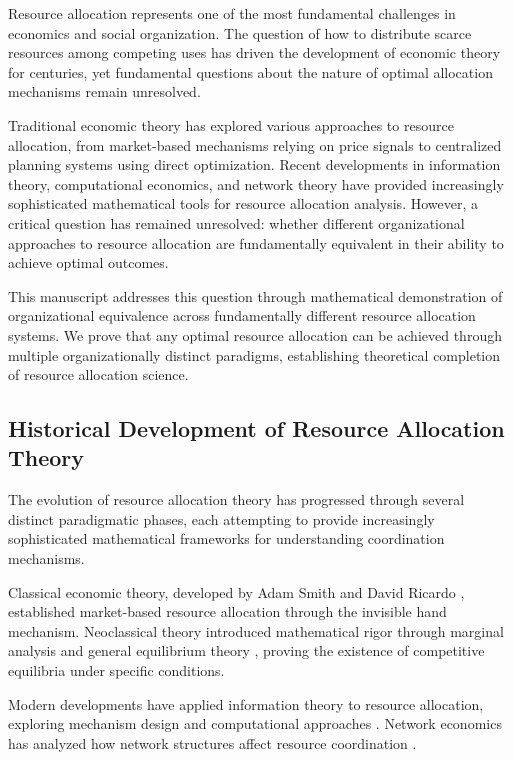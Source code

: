 \documentclass[12pt,a4paper]{article}
\begin{document}
Resource allocation represents one of the most fundamental challenges in economics and social organization. The question of how to distribute scarce resources among competing uses has driven the development of economic theory for centuries, yet fundamental questions about the nature of optimal allocation mechanisms remain unresolved.

Traditional economic theory has explored various approaches to resource allocation, from market-based mechanisms relying on price signals to centralized planning systems using direct optimization. Recent developments in information theory, computational economics, and network theory have provided increasingly sophisticated mathematical tools for resource allocation analysis. However, a critical question has remained unresolved: whether different organizational approaches to resource allocation are fundamentally equivalent in their ability to achieve optimal outcomes.

This manuscript addresses this question through mathematical demonstration of organizational equivalence across fundamentally different resource allocation systems. We prove that any optimal resource allocation can be achieved through multiple organizationally distinct paradigms, establishing theoretical completion of resource allocation science.

\subsection{Historical Development of Resource Allocation Theory}

The evolution of resource allocation theory has progressed through several distinct paradigmatic phases, each attempting to provide increasingly sophisticated mathematical frameworks for understanding coordination mechanisms.

Classical economic theory, developed by Adam Smith \cite{smith1776} and David Ricardo \cite{ricardo1817}, established market-based resource allocation through the invisible hand mechanism. Neoclassical theory introduced mathematical rigor through marginal analysis and general equilibrium theory \cite{marshall1890,walras1874,pareto1906}, proving the existence of competitive equilibria under specific conditions.

Modern developments have applied information theory \cite{shannon1948,cover1991} to resource allocation, exploring mechanism design \cite{myerson1991} and computational approaches \cite{holland1992}. Network economics has analyzed how network structures affect resource coordination \cite{jackson2008,acemoglu2012}.
\end{document}
